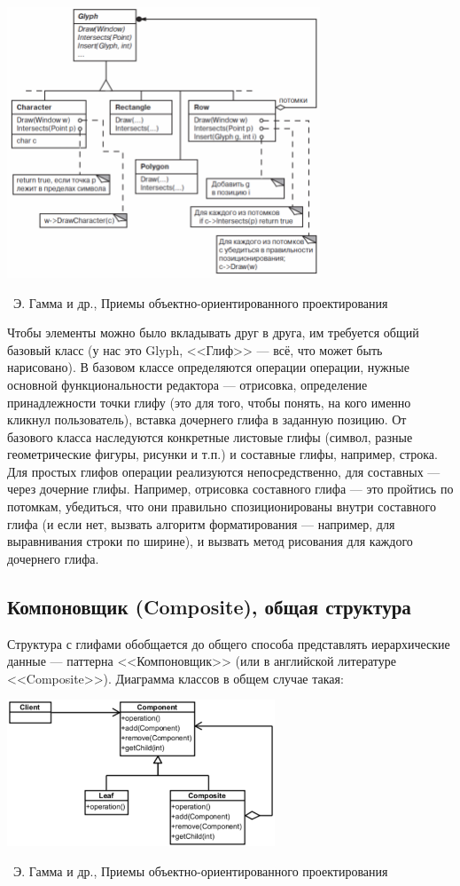 \documentclass[a5paper]{article}
\newcommand{\attribution}[1] {
    \vspace{-5mm}\begin{flushright}\begin{scriptsize}%
    {\textcopyright\, #1}\end{scriptsize}\end{flushright}
}
\begin{document}
\begin{center}
    \includegraphics[width=0.7\textwidth]{glyphs.png}
    \attribution{Э. Гамма и др., Приемы объектно-ориентированного проектирования}
\end{center}

Чтобы элементы можно было вкладывать друг в друга, им требуется общий базовый класс (у нас это Glyph, <<Глиф>> --- всё, что может быть нарисовано). В базовом классе определяются операции операции, нужные основной функциональности редактора --- отрисовка, определение принадлежности точки глифу (это для того, чтобы понять, на кого именно кликнул пользователь), вставка дочернего глифа в заданную позицию. От базового класса наследуются конкретные листовые глифы (символ, разные геометрические фигуры, рисунки и т.п.) и составные глифы, например, строка. Для простых глифов операции реализуются непосредственно, для составных --- через дочерние глифы. Например, отрисовка составного глифа --- это пройтись по потомкам, убедиться, что они правильно спозиционированы внутри составного глифа (и если нет, вызвать алгоритм форматирования --- например, для выравнивания строки по ширине), и вызвать метод рисования для каждого дочернего глифа.

\subsection{Компоновщик (Composite), общая структура}

Структура с глифами обобщается до общего способа представлять иерархические данные --- паттерна <<Компоновщик>> (или в английской литературе <<Composite>>). Диаграмма классов в общем случае такая:

\begin{center}
    \includegraphics[width=0.6\textwidth]{composite.png}
    \attribution{Э. Гамма и др., Приемы объектно-ориентированного проектирования}
\end{center}
\end{document}
